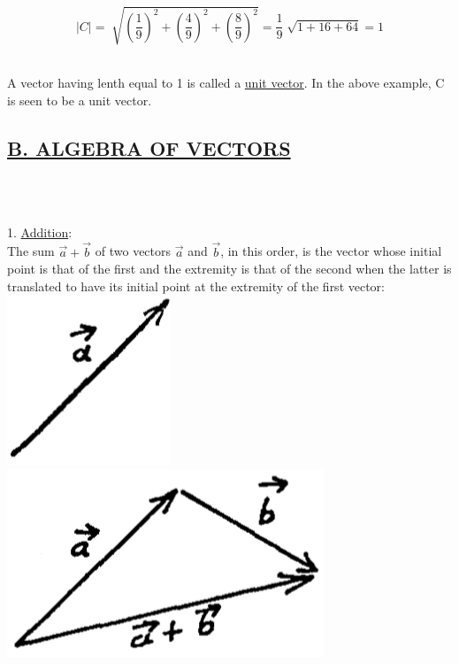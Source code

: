 \documentclass[11pt]{amsbook}
\begin{document}



    \[ \left| C \right| = \sqrt[]{(\frac{1}{9})^2 + (\frac{4}{9})^2 + (\frac{8}{9})^2 } = \frac{1}{9} \sqrt[]{1 + 16 + 64} = 1 \]
    
    
    \\ A vector having lenth equal to 1 is called a \underline{unit vector}. In the above example, C is seen to be a unit vector.
    
    


    \subsection*{\underline{B. ALGEBRA OF VECTORS}}~
    
    \\1. \underline{Addition}:
    \\ The sum \(\vec{a} + \vec{b}\) of two vectors \(\vec{a}\) and \(\vec{b}\), in this order, is the vector whose initial point is that of the first and the extremity is that of the second when the latter is translated to have its initial point at the extremity of the first vector:
    \\\includegraphics[scale = 0.7]{images/b2p1-122_fig1} \includegraphics[scale=0.7]{images/b2p1-122_fig2}
    
\end{document}
